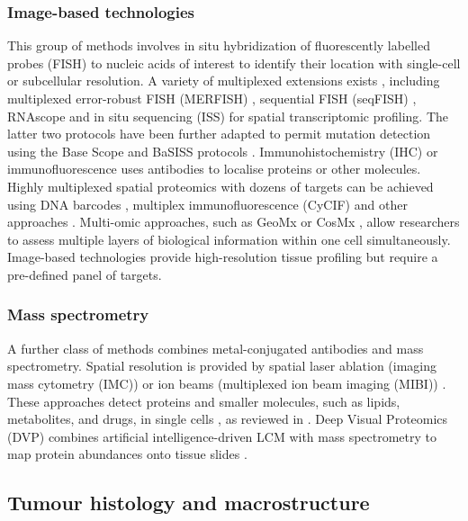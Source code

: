 {    \subsubsection*{Image-based technologies}
    This group of methods involves in situ hybridization of fluorescently labelled probes (FISH) to nucleic acids of interest to identify their location with single-cell or subcellular resolution. A variety of multiplexed extensions exists \parencite{Chen2015-ab,Lyubimova2013-jd,Chen2016-if,Coskun2016-jr,Codeluppi2018-nd,Wang2018-sl, Lee2015-ge,Qian2020-mp,Chen2018-dg,Alon2021-ce,Gyllborg2020-uq}, including multiplexed error-robust FISH (MERFISH) \parencite{Su2020-fb,Lu2022-yq}, sequential FISH (seqFISH) \parencite{Eng2019-rx}, RNAscope \parencite{Wang2012-pv} and in situ sequencing (ISS) \parencite{Ke2013-ux} for spatial transcriptomic profiling. The latter two protocols have been further adapted to permit mutation detection using the Base Scope \parencite{Baker2017-dv} and BaSISS protocols \parencite{Lomakin2022-ks}. Immunohistochemistry (IHC) or immunofluorescence uses antibodies to localise proteins or other molecules. Highly multiplexed spatial proteomics with dozens of targets can be achieved using DNA barcodes \parencite{Goltsev2018-dd,Saka2019-lb}, multiplex immunofluorescence (CyCIF) \parencite{Lin2018-qf} and other approaches \parencite{Lin2015-ml,Gerdes2013-kn,Keren2019-cu}. Multi-omic approaches, such as GeoMx or CosMx \parencite{He2022-ee,Bergholtz2021-ql}, allow researchers to assess multiple layers of biological information within one cell simultaneously. Image-based technologies provide high-resolution tissue profiling but require a pre-defined panel of targets.
    \subsubsection*{Mass spectrometry}
    A further class of methods combines metal-conjugated antibodies and mass spectrometry. Spatial resolution is provided by spatial laser ablation (imaging mass cytometry (IMC)) \parencite{Giesen2014-yd} or ion beams (multiplexed ion beam imaging (MIBI)) \parencite{Angelo2014-gf}. These approaches detect proteins and smaller molecules, such as lipids, metabolites, and drugs, in single cells \parencite{Giesen2014-yd}, as reviewed in \textcite{Mund2022-kf}. Deep Visual Proteomics (DVP) combines artificial intelligence-driven LCM with mass spectrometry to map protein abundances onto tissue slides \parencite{Mund2022-fw}.}

\subsection*{Tumour histology and macrostructure}

